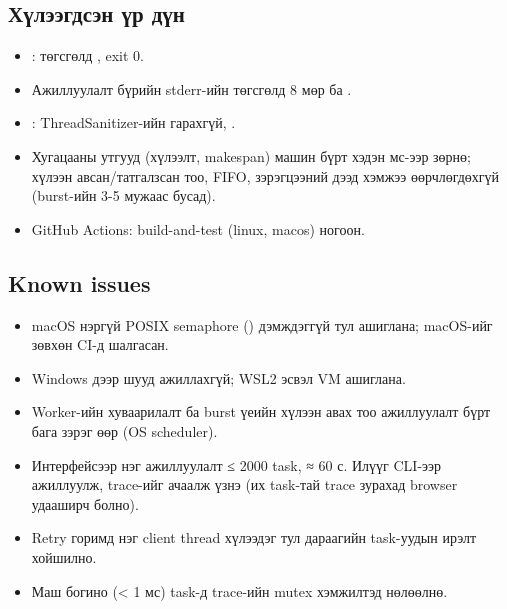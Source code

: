 \documentclass[12pt,a4paper]{article}
\begin{document}
\subsection{Хүлээгдсэн үр дүн}

\begin{itemize}
  \item {}: төгсгөлд , exit 0.
  \item Ажиллуулалт бүрийн stderr-ийн төгсгөлд 8 мөр \code{[ OK ]} ба .
  \item {}: ThreadSanitizer-ийн  гарахгүй, .
  \item Хугацааны утгууд (хүлээлт, makespan) машин бүрт хэдэн мс-ээр зөрнө; хүлээн авсан/татгалзсан тоо, FIFO, зэрэгцээний дээд хэмжээ өөрчлөгдөхгүй (burst-ийн 3-5 мужаас бусад).
  \item GitHub Actions: build-and-test (linux, macos) ногоон.
\end{itemize}

\subsection{Known issues}

\begin{itemize}
  \item macOS нэргүй POSIX semaphore () дэмждэггүй тул  ашиглана; macOS-ийг зөвхөн CI-д шалгасан.
  \item Windows дээр шууд ажиллахгүй; WSL2 эсвэл VM ашиглана.
  \item Worker-ийн хуваарилалт ба burst үеийн хүлээн авах тоо ажиллуулалт бүрт бага зэрэг өөр (OS scheduler).
  \item Интерфейсээр нэг ажиллуулалт ≤ 2000 task, ≈ 60 с. Илүүг CLI-ээр ажиллуулж, trace-ийг ачаалж үзнэ (их task-тай trace зурахад browser удааширч болно).
  \item Retry горимд нэг client thread хүлээдэг тул дараагийн task-уудын ирэлт хойшилно.
  \item Маш богино (< 1 мс) task-д trace-ийн mutex хэмжилтэд нөлөөлнө.
\end{itemize}
\end{document}
